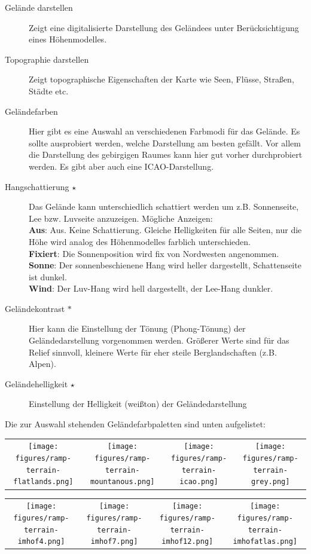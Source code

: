 \begin{description}
\item[Gelände darstellen]  Zeigt eine digitalisierte Darstellung des Geländees unter Berücksichtigung eines Höhenmodelles.
\item[Topographie darstellen]  Zeigt topographische Eigenschaften der Karte wie Seen, Flüsse, Straßen, Städte etc.\
\item[Geländefarben]  Hier gibt es eine Auswahl an verschiedenen Farbmodi für das Gelände. Es sollte ausprobiert werden,
welche Darstellung am besten gefällt. Vor allem die Darstellung des gebirgigen Raumes kann hier gut vorher durchprobiert werden.
Es gibt aber auch eine ICAO-Darstellung.
\item[Hangschattierung $\star$]  \label{conf:shading} Das Gelände kann unterschiedlich schattiert werden
um z.B. Sonnenseite, Lee bzw. Luvseite anzuzeigen. Mögliche Anzeigen:\\
{\bf Aus}: Aus. Keine Schattierung. Gleiche  Helligkeiten für alle Seiten, nur die Höhe wird analog des
Höhenmodelles farblich unterschieden.\\
{\bf Fixiert}: Die Sonnenposition wird fix von Nordwesten angenommen.\\
{\bf Sonne}: Der sonnenbeschienene  Hang wird heller dargestellt, Schattenseite ist dunkel.\\
{\bf Wind}: Der Luv-Hang wird hell dargestellt, der Lee-Hang dunkler.\\ 
\item[Geländekontrast $\ast$]  Hier kann die Einstellung der Tönung (Phong-Tönung) der Geländedarstellung
vorgenommen werden.
Größerer Werte sind für das Relief sinnvoll, kleinere Werte für eher
steile Berglandschaften (z.B. Alpen).
\item[Geländehelligkeit $\star$]  Einstellung der Helligkeit (weißton) der Geländedarstellung
\end{description}

Die zur Auswahl stehenden Geländefarbpaletten sind unten aufgelistet:

\begin{longtable}{c c c c}
\texttt{[image: figures/ramp-terrain-flatlands.png]}&
\texttt{[image: figures/ramp-terrain-mountanous.png]}&
\texttt{[image: figures/ramp-terrain-icao.png]}&
\texttt{[image: figures/ramp-terrain-grey.png]}
\end{longtable}

\begin{longtable}{c c c c}
\texttt{[image: figures/ramp-terrain-imhof4.png]}&
\texttt{[image: figures/ramp-terrain-imhof7.png]}&
\texttt{[image: figures/ramp-terrain-imhof12.png]}&
\texttt{[image: figures/ramp-terrain-imhofatlas.png]}
\end{longtable}

